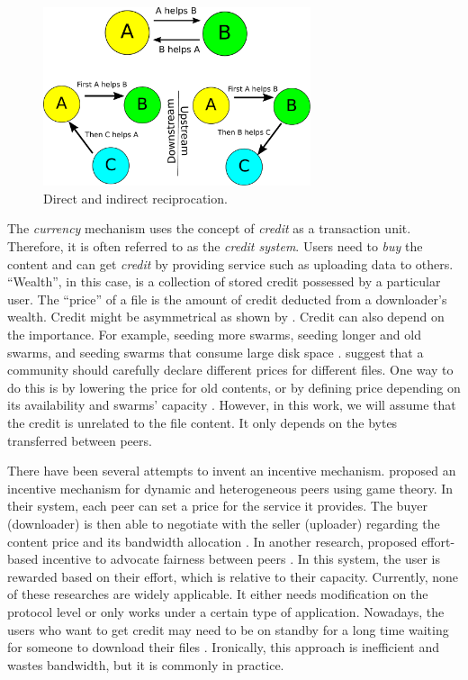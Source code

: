 \begin{figure}[t]
	\centering
	\includegraphics[width=0.7\textwidth]{pics/reciprocation.pdf}
	\caption{Direct and indirect reciprocation.}
	\label{fig:reciprocation}
\end{figure}

The \textit{currency} mechanism uses the concept of \textit{credit} as a transaction unit. Therefore, it is often referred to as the \textit{credit system}. Users need to \textit{buy} the content and can get \textit{credit} by providing service such as uploading data to others. ``Wealth'', in this case, is a collection of stored credit possessed by a particular user. The ``price'' of a file is the amount of credit deducted from a downloader's wealth. Credit might be asymmetrical as shown by \citeauthor{2012:economicbt:kash}\cite{2012:economicbt:kash}. Credit can also depend on the importance. For example, seeding more swarms, seeding longer and old swarms, and seeding swarms that consume large disk space \cite{2014:sustainabilitytorrent:chen}. \citeauthor{2012:economicbt:kash} suggest that a community should carefully declare different prices for different files. One way to do this is by lowering the price for old contents, or by defining price depending on its availability and swarms' capacity \cite{2012:economicbt:kash}. However, in this work, we will assume that the credit is unrelated to the file content. It only depends on the bytes transferred between peers.

There have been several attempts to invent an incentive mechanism. \citeauthor{2015:incentivep2pgame:kang} proposed an incentive mechanism for dynamic and heterogeneous peers using game theory. In their system, each peer can set a price for the service it provides. The buyer (downloader) is then able to negotiate with the seller (uploader) regarding the content price and its bandwidth allocation \cite{2015:incentivep2pgame:kang}. In another research, \citeauthor{2010:effortincentive:rahman} proposed effort-based incentive to advocate fairness between peers \cite{2010:effortincentive:rahman}. In this system, the user is rewarded based on their effort, which is relative to their capacity. Currently, none of these researches are widely applicable. It either needs modification on the protocol level or only works under a certain type of application. Nowadays, the users who want to get credit may need to be on standby for a long time waiting for someone to download their files \cite{2013:survivepriv:jia}. Ironically, this approach is inefficient and wastes bandwidth, but it is commonly in practice\cite{2013:survivepriv:jia}.

